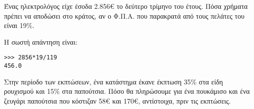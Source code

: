 \begin{exercise}
Ένας ηλεκτρολόγος είχε έσοδα 2.856€ το δεύτερο τρίμηνο του έτους. Πόσα χρήματα
πρέπει να αποδώσει στο κράτος, αν ο Φ.Π.Α. που παρακρατά από τους πελάτες του
είναι 19\%.
\end{exercise}
Η σωστή απάντηση είναι:
\begin{lstlisting}
>>> 2856*19/119
456.0
\end{lstlisting}

\begin{exercise}
Στην περίοδο των εκπτώσεων, ένα κατάστημα έκανε έκπτωση 35\% στα είδη ρουχισμού
και 15\% στα παπούτσια. Πόσο θα πληρώσουμε για ένα πουκάμισο και ένα ζευγάρι
παπούτσια που κόστιζαν 58€ και 170€, αντίστοιχα, πριν τις εκπτώσεις.
\end{exercise}

